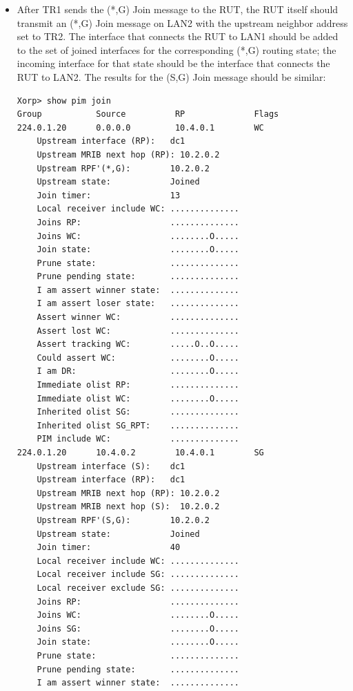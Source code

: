 \documentclass[11pt]{report}
\begin{document}
\begin{itemize}

  \item After TR1 sends the (*,G) Join message to the RUT, the RUT
  itself should transmit an (*,G) Join message on LAN2 with the upstream
  neighbor address set to TR2. The interface that connects the RUT to LAN1
  should be added to the set of joined interfaces for the corresponding
  (*,G) routing state; the incoming interface for that state should be the
  interface that connects the RUT to LAN2. The results for the (S,G) Join
  message should be similar:

\begin{verbatim}
Xorp> show pim join 
Group           Source          RP              Flags
224.0.1.20      0.0.0.0         10.4.0.1        WC   
    Upstream interface (RP):   dc1
    Upstream MRIB next hop (RP): 10.2.0.2
    Upstream RPF'(*,G):        10.2.0.2
    Upstream state:            Joined 
    Join timer:                13
    Local receiver include WC: ..............
    Joins RP:                  ..............
    Joins WC:                  ........O.....
    Join state:                ........O.....
    Prune state:               ..............
    Prune pending state:       ..............
    I am assert winner state:  ..............
    I am assert loser state:   ..............
    Assert winner WC:          ..............
    Assert lost WC:            ..............
    Assert tracking WC:        .....O..O.....
    Could assert WC:           ........O.....
    I am DR:                   ........O.....
    Immediate olist RP:        ..............
    Immediate olist WC:        ........O.....
    Inherited olist SG:        ..............
    Inherited olist SG_RPT:    ..............
    PIM include WC:            ..............
224.0.1.20      10.4.0.2        10.4.0.1        SG   
    Upstream interface (S):    dc1
    Upstream interface (RP):   dc1
    Upstream MRIB next hop (RP): 10.2.0.2
    Upstream MRIB next hop (S):  10.2.0.2
    Upstream RPF'(S,G):        10.2.0.2
    Upstream state:            Joined 
    Join timer:                40
    Local receiver include WC: ..............
    Local receiver include SG: ..............
    Local receiver exclude SG: ..............
    Joins RP:                  ..............
    Joins WC:                  ........O.....
    Joins SG:                  ........O.....
    Join state:                ........O.....
    Prune state:               ..............
    Prune pending state:       ..............
    I am assert winner state:  ..............

\end{verbatim}
\end{itemize}
\end{document}
